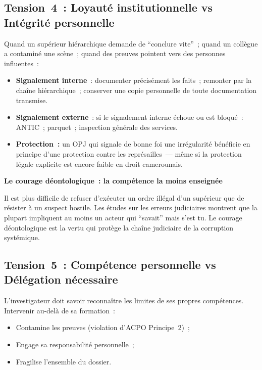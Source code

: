 \subsection{Tension~4~: Loyauté institutionnelle vs Intégrité personnelle}

Quand un supérieur hiérarchique demande de ``conclure vite''~; quand
un collègue a contaminé une scène~; quand des preuves pointent vers
des personnes influentes~:

\begin{itemize}
    \item \textbf{Signalement interne}~: documenter précisément les
          faits~; remonter par la chaîne hiérarchique~; conserver une
          copie personnelle de toute documentation transmise.
    \item \textbf{Signalement externe}~: si le signalement interne
          échoue ou est bloqué~: ANTIC~; parquet~; inspection générale
          des services.
    \item \textbf{Protection~:} un OPJ qui signale de bonne foi une
          irrégularité bénéficie en principe d'une protection contre
          les représailles~--- même si la protection légale explicite
          est encore faible en droit camerounais.
\end{itemize}

\begin{boxalert}
\textbf{Le courage déontologique~: la compétence la moins enseignée}

Il est plus difficile de refuser d'exécuter un ordre illégal d'un
supérieur que de résister à un suspect hostile. Les études sur les
erreurs judiciaires montrent que la plupart impliquent au moins un
acteur qui ``savait'' mais s'est tu. Le courage déontologique est
la vertu qui protège la chaîne judiciaire de la corruption systémique.
\end{boxalert}

\subsection{Tension~5~: Compétence personnelle vs Délégation nécessaire}

L'investigateur doit savoir reconnaître les limites de ses propres
compétences. Intervenir au-delà de sa formation~:
\begin{itemize}
    \item Contamine les preuves (violation d'ACPO Principe~2)~;
    \item Engage sa responsabilité personnelle~;
    \item Fragilise l'ensemble du dossier.
\end{itemize}


